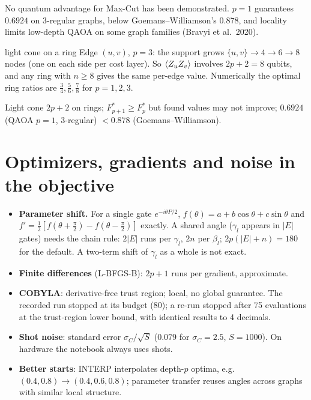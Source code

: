 \documentclass[11pt,a4paper,openany]{book}
\newcounter{wex}[chapter]
\begin{document}
No quantum advantage for Max-Cut has been demonstrated. $p = 1$ guarantees $0.6924$ on 3-regular graphs, below
Goemans--Williamson's $0.878$, and locality limits low-depth QAOA on some graph families (Bravyi et al.\ 2020).

\begin{wexample}{light cone on a ring}
Edge $(u, v)$, $p = 3$: the support grows $\{u, v\} \to 4 \to 6 \to 8$ nodes (one on each side per cost layer). So $\braket{Z_uZ_v}$ involves $2p + 2 = 8$ qubits, and
any ring with $n \ge 8$ gives the same per-edge value. Numerically the optimal ring ratios are $\frac34, \frac56, \frac78$ for $p = 1, 2, 3$.
\end{wexample}
\begin{checklist}
Light cone $2p + 2$ on rings; $F_{p+1}^* \ge F_p^*$ but found values may not improve; $0.6924$ (QAOA $p = 1$, 3-regular) $< 0.878$ (Goemans--Williamson).
\end{checklist}

\section{Optimizers, gradients and noise in the objective}
\begin{itemize}
\item \textbf{Parameter shift.} For a single gate $e^{-i\theta P/2}$, $f(\theta) = a + b\cos\theta + c\sin\theta$ and
$f' = \frac12[f(\theta + \frac\pi2) - f(\theta - \frac\pi2)]$ exactly. A shared angle ($\gamma_l$ appears in $|E|$ gates) needs the chain rule:
$2|E|$ runs per $\gamma_l$, $2n$ per $\beta_l$; $2p(|E| + n) = 180$ for the default. A two-term shift of $\gamma_l$ as a whole is not exact.
\item \textbf{Finite differences} (L-BFGS-B): $2p + 1$ runs per gradient, approximate.
\item \textbf{COBYLA}: derivative-free trust region; local, no global guarantee. The recorded run stopped at its budget (80); a re-run
stopped after 75 evaluations at the trust-region lower bound, with identical results to 4 decimals.
\item \textbf{Shot noise}: standard error $\sigma_C/\sqrt S$ ($0.079$ for $\sigma_C = 2.5$, $S = 1000$). On hardware the notebook always uses shots.
\item \textbf{Better starts}: INTERP interpolates depth-$p$ optima, e.g.\ $(0.4, 0.8) \to (0.4, 0.6, 0.8)$; parameter transfer reuses angles across
graphs with similar local structure.
\end{itemize}
\end{document}
